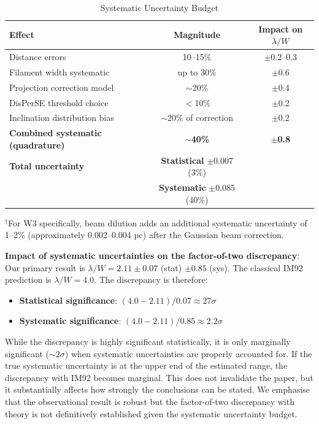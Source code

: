 \documentclass[11pt,a4paper]{article}
\begin{document}
\begin{table}[H]
\centering
\caption{Systematic Uncertainty Budget}
\label{tab:uncertainties}
\begin{tabular}{lcc}
\toprule
Effect & Magnitude & Impact on $\lambda/W$ \\
\midrule
Distance errors & 10--15\% & $\pm$0.2--0.3 \\
Filament width systematic & up to 30\% & $\pm$0.6 \\
Projection correction model & $\sim$20\% & $\pm$0.4 \\
DisPerSE threshold choice & $<$10\% & $\pm$0.2 \\
Inclination distribution bias & $\sim$20\% of correction & $\pm$0.2 \\
\textbf{Combined systematic (quadrature)} & \textbf{$\sim$40\%} & \textbf{$\pm$0.8} \\
\midrule
\textbf{Total uncertainty} & \textbf{Statistical} $\pm$0.007 (3\%) & \\
& \textbf{Systematic} $\pm$0.085 (40\%) & \\
\bottomrule
\end{tabular}
\vspace{-0.5em}
\small{$^{\dagger}$For W3 specifically, beam dilution adds an additional systematic uncertainty of 1--2\% (approximately 0.002--0.004 pc) after the Gaussian beam correction.}
\end{table}

\textbf{Impact of systematic uncertainties on the factor-of-two discrepancy}: Our primary result is $\lambda/W = 2.11 \pm 0.07$ (stat) $\pm 0.85$ (sys). The classical IM92 prediction is $\lambda/W = 4.0$. The discrepancy is therefore:
\begin{itemize}
    \item \textbf{Statistical significance}: $(4.0 - 2.11) / 0.07 \approx 27\sigma$
    \item \textbf{Systematic significance}: $(4.0 - 2.11) / 0.85 \approx 2.2\sigma$
\end{itemize}
While the discrepancy is highly significant statistically, it is only marginally significant ($\sim2\sigma$) when systematic uncertainties are properly accounted for. If the true systematic uncertainty is at the upper end of the estimated range, the discrepancy with IM92 becomes marginal. This does not invalidate the paper, but it substantially affects how strongly the conclusions can be stated. We emphasise that the observational result is robust but the factor-of-two discrepancy with theory is not definitively established given the systematic uncertainty budget.
\end{document}
